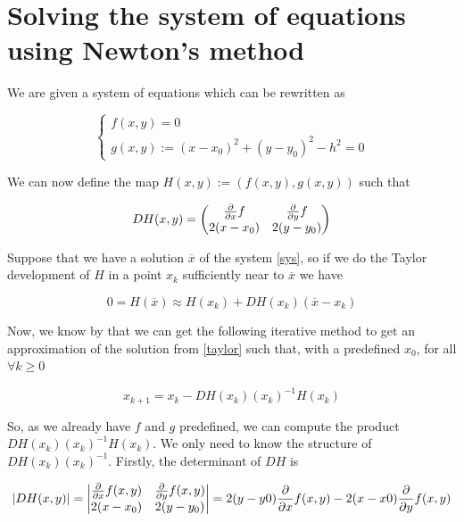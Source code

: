 \documentclass[11pt]{article}
\begin{document}
\section{Solving the system of equations using Newton's method}

We are given a system of equations which can be rewritten as 

\begin{equation}
    \label{sys}
    \begin{cases}
        f(x, y) = 0 \\
        g(x, y) := (x - x_0)^2 + (y - y_0)^2 - h^2 = 0
    \end{cases}
\end{equation}

We can now define the map $H(x, y) := (f(x, y), g(x, y))$ such that

\begin{equation}
DH(x, y) = 
\begin{pmatrix}
    \df{x}     & \df{y} \\
    2(x - x_0) & 2(y - y_0)
\end{pmatrix}
\end{equation}

Suppose that we have a solution $\overline{x}$ of the system \ref{sys}, so if we do the Taylor development of $H$ in a 
point $x_k$ sufficiently near to $\overline{x}$ we have

\begin{equation}
    \label{taylor}
    0 = H (\overline{x}) \approx H(x_k) + DH(x_k)(\overline{x} − x_k)
\end{equation}

Now, we know by \cite[Equation 3.1]{MN2:1} that we can get the following iterative method to get an approximation of the solution from \ref{taylor} such that, with a predefined $x_0$, for all $\forall k \geq 0$

\begin{equation}
    \label{newton}
    x_{k+1} = x_k - DH(x_k)(x_k)^{-1} H(x_k)
\end{equation}

So, as we already have $f$ and $g$ predefined, we can compute the product $DH(x_k)(x_k)^{-1} H(x_k)$.
We only need to know the structure of $DH(x_k)(x_k)^{-1}$.
Firstly, the determinant of $DH$ is 

\begin{equation}
|DH(x, y)| = 
\begin{vmatrix}
    \df{x}(x, y)     & \df{y}(x, y) \\
    2(x - x_0) & 2(y - y_0)
\end{vmatrix}
=
2 (y - y0) \df{x}(x, y) -
2 (x - x0) \df{y}(x, y)
\end{equation}
\end{document}

